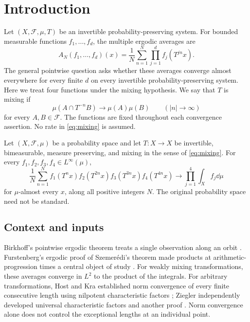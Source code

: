 \section{Introduction}\label{sec:introduction}

Let $(X,\mathcal F,\mu,T)$ be an invertible probability-preserving system.
For bounded measurable functions $f_1,\ldots,f_d$, the multiple ergodic
averages are
\[
A_N(f_1,\ldots,f_d)(x)
=\frac1N\sum_{n=1}^N\prod_{j=1}^d f_j(T^{jn}x).
\]
The general pointwise question asks whether these averages converge
almost everywhere for every finite $d$ on every invertible
probability-preserving system. Here we treat four functions under
the mixing hypothesis. We say that $T$ is mixing if
\begin{equation}\label{eq:mixing}
 \mu(A\cap T^{-n}B)\longrightarrow\mu(A)\mu(B)
 \qquad (|n|\longrightarrow\infty)
\end{equation}
for every $A,B\in\mathcal F$. The functions are fixed throughout each
convergence assertion. No rate in \eqref{eq:mixing} is assumed.

\begin{theorem}\label{thm:main}
Let $(X,\mathcal F,\mu)$ be a probability space and let $T:X\to X$
be invertible, bimeasurable, measure preserving, and mixing in the sense
of \eqref{eq:mixing}. For every $f_1,f_2,f_3,f_4\in L^\infty(\mu)$,
\[
 \frac1N\sum_{n=1}^N
 f_1(T^nx)f_2(T^{2n}x)f_3(T^{3n}x)f_4(T^{4n}x)
 \longrightarrow \prod_{j=1}^4\int_X f_j\dd\mu
\]
for $\mu$-almost every $x$, along all positive integers $N$.
The original probability space need not be standard.
\end{theorem}

\subsection*{Context and inputs}

Birkhoff's pointwise ergodic theorem treats a single observation along
an orbit \cite{Birkhoff}. Furstenberg's ergodic proof of Szemer\'edi's
theorem made products at arithmetic-progression times a central object
of study \cite{Furstenberg}. For weakly mixing transformations, these
averages converge in $L^2$ to the product of the integrals. For arbitrary
transformations, Host and Kra established norm convergence of every
finite consecutive length using nilpotent characteristic factors
\cite[Theorem~1.1]{HostKra}; Ziegler independently developed universal
characteristic factors and another proof \cite{Ziegler}. Norm
convergence alone does not control the exceptional lengths at an
individual point.

